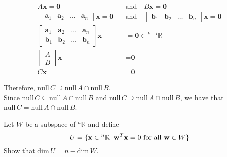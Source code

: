 \documentclass[10pt]{exam}
\newcommand{\noin}{\noindent}
\begin{document}
{{			\begin{align*}
				A\textbf{x} = \textbf{0} \quad &\text{and} \quad B\textbf{x} = \textbf{0}\\
				\begin{bmatrix}\textbf{a}_1 & \textbf{a}_2 & \dots & \textbf{a}_n \end{bmatrix} \textbf{x} = \textbf{0} \quad &\text{and} \quad \begin{bmatrix}\textbf{b}_1 & \textbf{b}_2 & \dots & \textbf{b}_n \end{bmatrix} \textbf{x} = \textbf{0}\\
				\begin{bmatrix}
					\textbf{a}_1 & \textbf{a}_2 & \dots & \textbf{a}_n \\
					\textbf{b}_1 & \textbf{b}_2 & \dots & \textbf{b}_n
				\end{bmatrix} \textbf{x} &= \textbf{0} \in {^{k+l}}\mathbb R\\
				\begin{bmatrix} A\\ B \end{bmatrix}\textbf{x} &= \textbf{0}\\
				C\textbf{x} &= \textbf{0}
			\end{align*}

			Therefore, $\mathrm{null}\, C \supseteq  \mathrm{null}\, A \cap \mathrm{null}\, B$.\\

			Since $\mathrm{null}\, C \subseteq  \mathrm{null}\, A \cap \mathrm{null}\, B$ and $\mathrm{null}\, C \supseteq  \mathrm{null}\, A \cap \mathrm{null}\, B$, we have that $\mathrm{null}\, C = \mathrm{null}\, A \cap \mathrm{null}\, B$.


			}
		}
	





\pagebreak


\noin {\bf 2.}  Let $W$ be a subspace of ${}^n\mathbb R$ and define
\begin{equation*}
    U = \{{\bf x} \in {}^n\mathbb{R}\,|\, {\bf w}^T{\bf x} = 0~\text{for all}~{\bf w} \in W\}
\end{equation*}
Show that $\mbox{dim}\,U = n - \mbox{dim}\,W$.  
\end{document}
